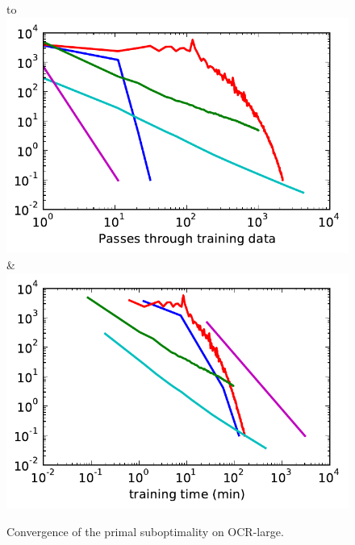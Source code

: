\begin{figure}
    \begin{tabu} to 
    \\[-3mm]
    \includegraphics[width=\linewidth]{evaluation/images/letters_big_log}&%
    \includegraphics[width=\linewidth]{evaluation/images/letters_big_log_time}
    \end{tabu}
\caption{%
   Convergence of the primal suboptimality on OCR-large. 
}
\end{figure}

